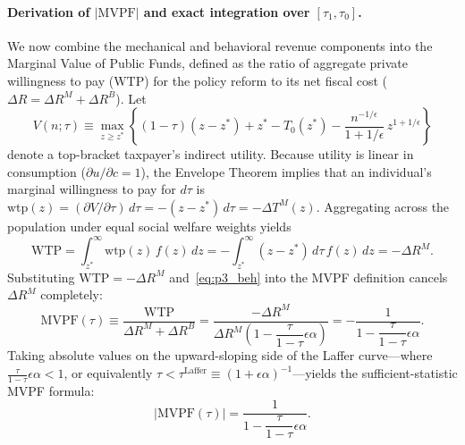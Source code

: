 \paragraph{Derivation of $|\mathrm{MVPF}|$ and exact integration over $[\tau_1, \tau_0]$.}
We now combine the mechanical and behavioral revenue components into the Marginal Value of Public Funds, defined as the ratio of aggregate private willingness to pay ($\mathrm{WTP}$) for the policy reform to its net fiscal cost ($\Delta R = \Delta R^M + \Delta R^B$). Let
\begin{equation}
V(n; \tau) \equiv \max_{z \ge z^*} \left\{ (1-\tau)(z - z^*) + z^* - T_0(z^*) - \frac{n^{-1/\epsilon}}{1 + 1/\epsilon}\,z^{1 + 1/\epsilon} \right\}
\end{equation}
denote a top-bracket taxpayer's indirect utility. Because utility is linear in consumption ($\partial u / \partial c = 1$), the Envelope Theorem implies that an individual's marginal willingness to pay for $d\tau$ is $\mathrm{wtp}(z) = (\partial V / \partial \tau)\,d\tau = -(z - z^*)\,d\tau = -\Delta T^M(z)$. Aggregating across the population under equal social welfare weights yields
\begin{equation}
\mathrm{WTP} = \int_{z^*}^\infty \mathrm{wtp}(z)\,f(z)\,dz = -\int_{z^*}^\infty (z - z^*)\,d\tau\,f(z)\,dz = -\Delta R^M.
\end{equation}
Substituting $\mathrm{WTP} = -\Delta R^M$ and~\eqref{eq:p3_beh} into the MVPF definition cancels $\Delta R^M$ completely:
\begin{equation}
\mathrm{MVPF}(\tau) \equiv \frac{\mathrm{WTP}}{\Delta R^M + \Delta R^B}
= \frac{-\Delta R^M}{\Delta R^M\left(1 - \dfrac{\tau}{1-\tau}\epsilon\alpha\right)}
= -\frac{1}{1 - \dfrac{\tau}{1-\tau}\epsilon\alpha}.
\end{equation}
Taking absolute values on the upward-sloping side of the Laffer curve—where $\frac{\tau}{1-\tau}\epsilon\alpha < 1$, or equivalently $\tau < \tau^{\mathrm{Laffer}} \equiv (1 + \epsilon\alpha)^{-1}$—yields the sufficient-statistic MVPF formula:
\begin{equation}
|\mathrm{MVPF}(\tau)| = \frac{1}{1 - \dfrac{\tau}{1-\tau}\epsilon\alpha}.
\label{eq:p3_mvpf}
\end{equation}

